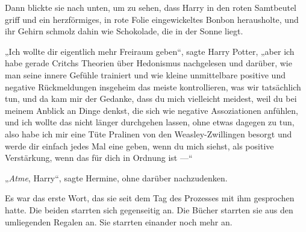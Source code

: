 Dann blickte sie nach unten, um zu sehen, dass Harry in den roten Samtbeutel griff und ein herzförmiges, in rote Folie eingewickeltes Bonbon herausholte, und ihr Gehirn schmolz dahin wie Schokolade, die in der Sonne liegt.

„Ich wollte dir eigentlich mehr Freiraum geben“, sagte Harry Potter, „aber ich habe gerade Critchs Theorien über Hedonismus nachgelesen und darüber, wie man seine innere Gefühle trainiert und wie kleine unmittelbare positive und negative Rückmeldungen insgeheim das meiste kontrollieren, was wir tatsächlich tun, und da kam mir der Gedanke, dass du mich vielleicht meidest, weil du bei meinem Anblick an Dinge denkst, die sich wie negative Assoziationen anfühlen, und ich wollte das nicht länger durchgehen lassen, ohne etwas dagegen zu tun, also habe ich mir eine Tüte Pralinen von den Weasley-Zwillingen besorgt und werde dir einfach jedes Mal eine geben, wenn du mich siehst, als positive Verstärkung, wenn das für dich in Ordnung ist —“

„\emph{Atme}, Harry“, sagte Hermine, ohne darüber nachzudenken.




Es war das erste Wort, das sie seit dem Tag des Prozesses mit ihm gesprochen hatte. Die beiden starrten sich gegenseitig an. Die Bücher starrten sie aus den umliegenden Regalen an. Sie starrten einander noch mehr an.

